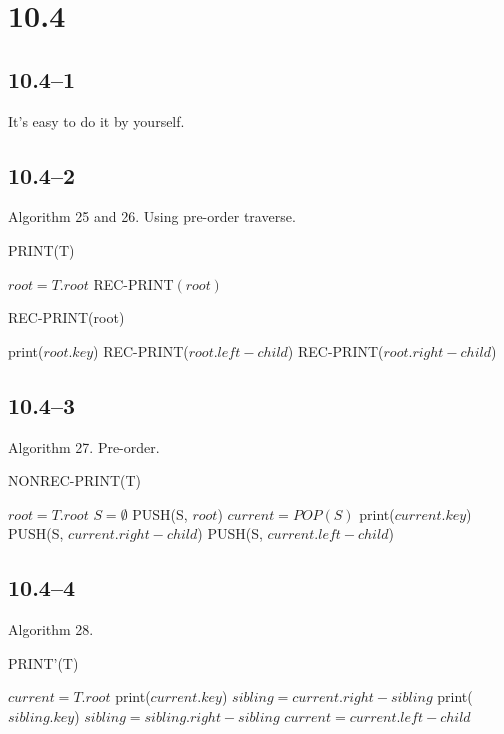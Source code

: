 \documentclass{article}
\begin{document}
\section*{10.4}
\subsection*{10.4--1}
It's easy to do it by yourself.

\subsection*{10.4--2}
Algorithm 25 and 26. Using pre-order traverse.
\begin{algorithm}
  \caption{PRINT(T)}
  \begin{algorithmic}[1]
    \STATE $root = T.root$
    \STATE REC-PRINT$(root)$
  \end{algorithmic}
\end{algorithm}

\begin{algorithm}
  \caption{REC-PRINT(root)}
  \begin{algorithmic}
    \STATE print($root.key$)
    \STATE REC-PRINT($root.left-child$)
    \STATE REC-PRINT($root.right-child$)
    \ENDIF
  \end{algorithmic}
\end{algorithm}

\subsection*{10.4--3}
Algorithm 27. Pre-order.
\begin{algorithm}
  \caption{NONREC-PRINT(T)}
  \begin{algorithmic}[1]
    \STATE $root = T.root$
    \STATE $S = \emptyset$ 
    \STATE PUSH(S, $root$)
    \STATE $current = POP(S)$
    \STATE print($current.key$)
    \STATE PUSH(S, $current.right-child$)
    \ENDIF
    \STATE PUSH(S, $current.left-child$)
    \ENDIF
    \ENDWHILE
  \end{algorithmic}
\end{algorithm}

\subsection*{10.4--4}
Algorithm 28.
\begin{algorithm}
  \caption{PRINT'(T)}
  \begin{algorithmic}[1]
    \STATE $current = T.root$
    \STATE print($current.key$)
    \STATE $sibling = current.right-sibling$
    \STATE print($sibling.key$)
    \STATE $sibling = sibling.right-sibling$
    \ENDWHILE
    \STATE $current = current.left-child$
    \ENDWHILE
  \end{algorithmic}
\end{algorithm}
\end{document}
